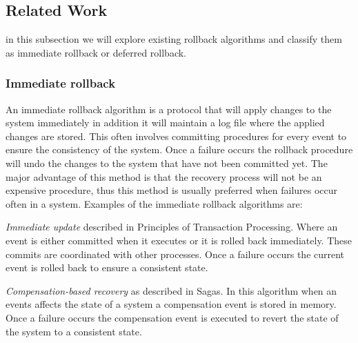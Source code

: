 \documentclass[twocolumn, a4paper,11pt]{article}%
\begin{document}
\subsection{Related Work}
\par in this subsection we will explore existing rollback algorithms and classify them as immediate rollback or deferred rollback.

\subsubsection*{Immediate rollback}
\par An immediate rollback algorithm is a protocol that will apply changes to the system immediately in addition it will maintain a log file where the applied changes are stored. This often involves committing procedures for every event to ensure the consistency of the system. Once a failure occurs the rollback procedure will undo the changes to the system that have not been committed yet. The major advantage of this method is that the recovery process will not be an expensive procedure, thus this method is usually preferred when failures occur often in a system. Examples of the immediate rollback algorithms are:
\par \textit{Immediate update} described in Principles of Transaction Processing\cite{bernstein2009principles}.  Where an event is either committed when it executes or it is rolled back immediately. These commits are coordinated with other processes. Once a failure occurs the current event is rolled back to ensure a consistent state. 
\par \textit{Compensation-based recovery} as described in Sagas\cite{garcia1987sagas}. In this algorithm when an events affects the state of a system a compensation event is stored in memory. Once a failure occurs the compensation event is executed to revert the state of the system to a consistent state.
\end{document}
